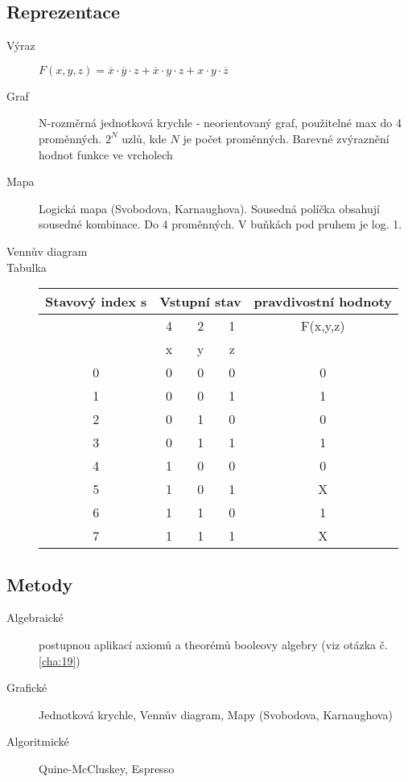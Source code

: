\documentclass[a4paper, 11pt]{report}
\begin{document}
\subsection{Reprezentace}

\begin{description}
	\item[Výraz] 
		$ F(x,y,z) = \overline{x} \cdot \overline{y} \cdot z + \overline{x} \cdot y \cdot z + x \cdot y \cdot \overline{z}$
	\item[Graf] N-rozměrná jednotková krychle - neorientovaný graf, použitelné max do 4 proměnných. $2^N$ uzlů, kde $N$ je počet proměnných. Barevné zvýraznění hodnot funkce ve vrcholech
	\item[Mapa] Logická mapa (Svobodova, Karnaughova). Sousedná políčka obsahují sousedné kombinace. Do 4 proměnných. V buňkách pod pruhem je log. 1.
	\item[Vennův diagram]
	\item[Tabulka]
		\begin{tabular}{| c | c | c | c | c | }
			\hline
			\multirow{3}{*}{Stavový index s}	& \multicolumn{3}{|c|}{Vstupní stav} & pravdivostní hodnoty \\ \hline
				& 4 & 2 & 1 & F(x,y,z) \\ \hline
				& x & y & z & 	\\ \hline
			0   & 0 & 0 & 0 & 0 \\ \hline
			1   & 0 & 0 & 1 & 1 \\ \hline
			2   & 0 & 1 & 0 & 0 \\ \hline
			3   & 0 & 1 & 1 & 1 \\ \hline
			4   & 1 & 0 & 0 & 0 \\ \hline
			5   & 1 & 0 & 1 & X \\ \hline
			6   & 1 & 1 & 0 & 1 \\ \hline
			7   & 1 & 1 & 1 & X \\ \hline
		\end{tabular}
		
\end{description}

\subsection{Metody}

\begin{description}
	\item[Algebraické] postupnou aplikací axiomů a theorémů booleovy algebry (viz otázka č. \ref{cha:19})
	\item[Grafické] Jednotková krychle, Vennův diagram, Mapy (Svobodova, Karnaughova)
	\item[Algoritmické] Quine-McCluskey, Espresso
\end{description}
\end{document}
